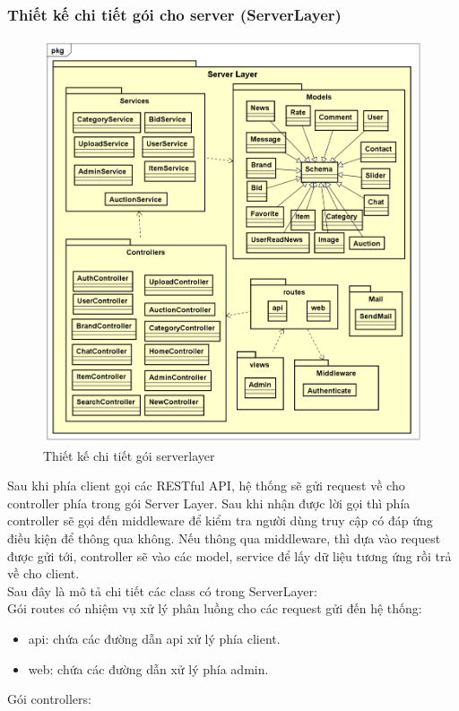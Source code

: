\documentclass[../DoAn.tex]{subfiles}
\begin{document}
\subsubsection{Thiết kế chi tiết gói cho server (ServerLayer)}
\begin{figure}[H]
    \centering
    \includegraphics[width=0.75\linewidth,height=11.9cm]{Hinhve/ServerLayer75.png}
    \caption{Thiết kế chi tiết gói serverlayer}
    \label{fig:Fig45}
\end{figure}
Sau khi phía client gọi các RESTful API, hệ thống sẽ gửi request về cho controller phía trong gói Server Layer. Sau khi nhận được lời gọi thì phía controller sẽ gọi đến middleware để kiểm tra người dùng truy cập có đáp ứng điều kiện để thông qua không. Nếu thông qua middleware, thì dựa vào request được gửi tới, controller sẽ vào các model, service để lấy dữ liệu tương ứng rồi trả về cho client.\\ 
Sau đây là mô tả chi tiết các class có trong ServerLayer:\\
Gói routes có nhiệm vụ xử lý phân luồng cho các request gửi đến hệ thống:
\begin{itemize}
    \item api: chứa các đường dẫn api xử lý phía client.
    \item web: chứa các đường dẫn xử lý phía admin.
\end{itemize}
Gói controllers:
\end{document}
